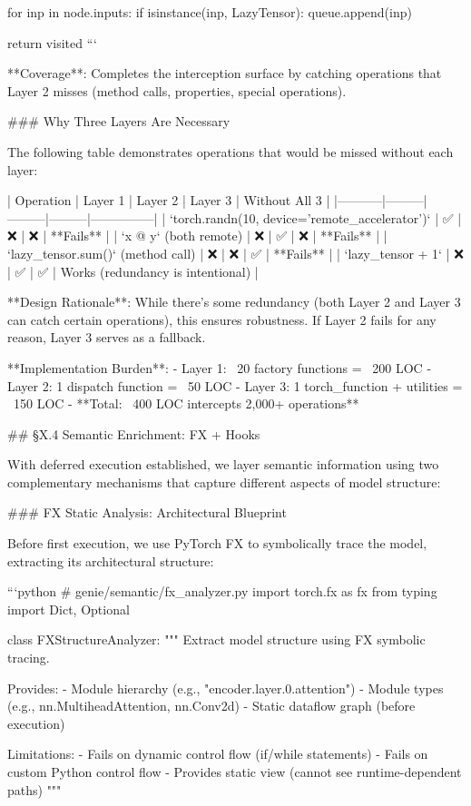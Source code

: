             for inp in node.inputs:
                if isinstance(inp, LazyTensor):
                    queue.append(inp)
        
        return visited
```

**Coverage**: Completes the interception surface by catching operations that Layer 2 misses (method calls, properties, special operations).

### Why Three Layers Are Necessary

The following table demonstrates operations that would be missed without each layer:

| Operation | Layer 1 | Layer 2 | Layer 3 | Without All 3 |
|-----------|---------|---------|---------|---------------|
| `torch.randn(10, device='remote_accelerator')` | ✅ | ❌ | ❌ | **Fails** |
| `x @ y` (both remote) | ❌ | ✅ | ❌ | **Fails** |
| `lazy_tensor.sum()` (method call) | ❌ | ❌ | ✅ | **Fails** |
| `lazy_tensor + 1` | ❌ | ✅ | ✅ | Works (redundancy is intentional) |

**Design Rationale**: While there's some redundancy (both Layer 2 and Layer 3 can catch certain operations), this ensures robustness. If Layer 2 fails for any reason, Layer 3 serves as a fallback.

**Implementation Burden**: 
- Layer 1: ~20 factory functions = ~200 LOC
- Layer 2: 1 dispatch function = ~50 LOC
- Layer 3: 1 torch_function + utilities = ~150 LOC
- **Total: ~400 LOC intercepts 2,000+ operations**

## §X.4 Semantic Enrichment: FX + Hooks

With deferred execution established, we layer semantic information using two complementary mechanisms that capture different aspects of model structure:

### FX Static Analysis: Architectural Blueprint

Before first execution, we use PyTorch FX to symbolically trace the model, extracting its architectural structure:

```python
# genie/semantic/fx_analyzer.py
import torch.fx as fx
from typing import Dict, Optional

class FXStructureAnalyzer:
    """
    Extract model structure using FX symbolic tracing.
    
    Provides:
    - Module hierarchy (e.g., "encoder.layer.0.attention")
    - Module types (e.g., nn.MultiheadAttention, nn.Conv2d)
    - Static dataflow graph (before execution)
    
    Limitations:
    - Fails on dynamic control flow (if/while statements)
    - Fails on custom Python control flow
    - Provides static view (cannot see runtime-dependent paths)
    """
    
